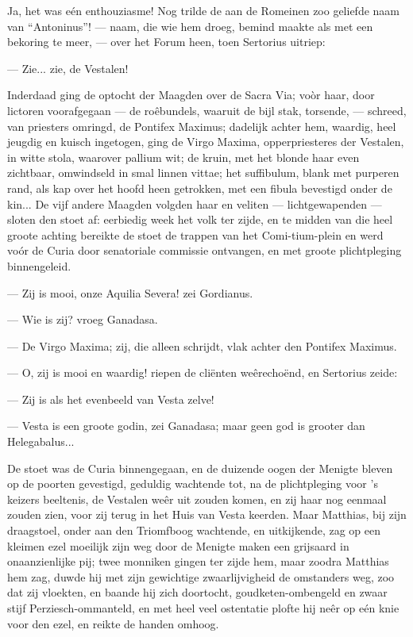 \documentclass[a4paper, 12pt, oneside, dutch]{article}
\begin{document}
Ja, het was eén enthouziasme! Nog trilde de aan de Romeinen zoo geliefde naam van "`Antoninus"'! --- naam, die wie hem droeg, bemind maakte als met een bekoring te meer, --- over het Forum heen, toen Sertorius uitriep:

--- Zie... zie, de Vestalen!

Inderdaad ging de optocht der Maagden over de Sacra Via; voòr haar, door lictoren voorafgegaan --- de roêbundels, waaruit de bijl stak, torsende, --- schreed, van priesters omringd, de Pontifex Maximus; dadelijk achter hem, waardig, heel jeugdig en kuisch ingetogen, ging de Virgo Maxima, opperpriesteres der Vestalen, in witte stola, waarover pallium wit; de kruin, met het blonde haar even zichtbaar, omwindseld in smal linnen vittae; het suffibulum, blank met purperen rand, als kap over het hoofd heen getrokken, met een fibula bevestigd onder de kin... De vijf andere Maagden volgden haar en veliten --- lichtgewapenden --- sloten den stoet af: eerbiedig week het volk ter zijde, en te midden van die heel groote achting bereikte de stoet de trappen van het Comi-tium-plein en werd voór de Curia door senatoriale commissie ontvangen, en met groote plichtpleging binnengeleid.

--- Zij is mooi, onze Aquilia Severa! zei Gordianus.

--- Wie is zij? vroeg Ganadasa.

--- De Virgo Maxima; zij, die alleen schrijdt, vlak achter den Pontifex Maximus.

--- O, zij is mooi en waardig! riepen de cliënten weêrechoënd, en Sertorius zeide:

--- Zij is als het evenbeeld van Vesta zelve!

--- Vesta is een groote godin, zei Ganadasa; maar geen god is grooter dan Helegabalus...

De stoet was de Curia binnengegaan, en de duizende oogen der Menigte bleven op de poorten gevestigd, geduldig wachtende tot, na de plichtpleging voor 's keizers beeltenis, de Vestalen weêr uit zouden komen, en zij haar nog eenmaal zouden zien, voor zij terug in het Huis van Vesta keerden. Maar Matthias, bij zijn draagstoel, onder aan den Triomfboog wachtende, en uitkijkende, zag op een kleimen ezel moeilijk zijn weg door de Menigte maken een grijsaard in onaanzienlijke pij; twee monniken gingen ter zijde hem, maar zoodra Matthias hem zag, duwde hij met zijn gewichtige zwaarlijvigheid de omstanders weg, zoo dat zij vloekten, en baande hij zich doortocht, goudketen-ombengeld en zwaar stijf Perziesch-ommanteld, en met heel veel ostentatie plofte hij neêr op eén knie voor den ezel, en reikte de handen omhoog.
\end{document}
